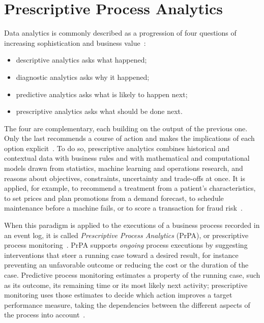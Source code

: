 \section{Prescriptive Process Analytics}
\label{sec:bg:prpa}
Data analytics is commonly described as a progression of four questions of
increasing sophistication and business value~\cite{ibm_prescriptive}:
\begin{itemize}
    \item descriptive analytics asks what happened;
    \item diagnostic analytics asks why it happened;
    \item predictive analytics asks what is likely to happen next;
    \item prescriptive analytics asks what should be done next.
\end{itemize}
The four are complementary, each building on the output of the previous one.
Only the last recommends a course of action and makes the implications of
each option explicit~\cite{wikipedia_prescriptive}. To do so, prescriptive
analytics combines historical and contextual data with business rules and
with mathematical and computational models drawn from statistics, machine
learning and operations research, and reasons about objectives,
constraints, uncertainty and trade-offs at once. It is applied, for
example, to recommend a treatment from a patient's characteristics, to set
prices and plan promotions from a demand forecast, to schedule maintenance
before a machine fails, or to score a transaction for fraud
risk~\cite{ibm_prescriptive}.

When this paradigm is applied to the executions of a business process
recorded in an event log, it is called \emph{Prescriptive Process Analytics}
(PrPA), or prescriptive process monitoring~\cite{kubrak2022}. PrPA supports
\emph{ongoing} process executions by suggesting interventions that steer a
running case toward a desired result, for instance preventing an
unfavorable outcome or reducing the cost or the duration of the case.
Predictive process monitoring estimates a property of the running case,
such as its outcome, its remaining time or its most likely next activity;
prescriptive monitoring uses those estimates to decide which action
improves a target performance measure, taking the dependencies between the
different aspects of the process into account~\cite{lepenioti2020}.


